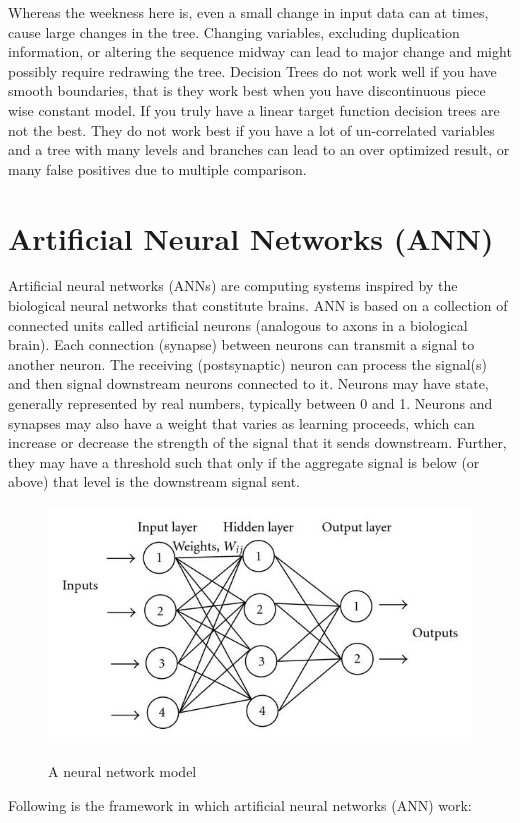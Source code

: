 \noindent Whereas the weekness here is, even a small change in input data can at times, cause large changes in the tree. Changing variables, excluding duplication information, or altering the sequence midway can lead to major change and might possibly require redrawing the tree. Decision Trees do not work well if you have smooth boundaries, that is they work best when you have discontinuous piece wise constant model. If you truly have a linear target function decision trees are not the best. They do not work best if you have a lot of un-correlated variables and a tree with many levels and branches can lead to an over optimized result, or many false positives due to multiple comparison.

\newpage

\section{Artificial Neural Networks (ANN)} \label{Artificial Neural Networks (ANN)}

\noindent Artificial neural networks (ANNs) are computing systems inspired by the biological neural networks that constitute brains. ANN is based on a collection of connected units called artificial neurons (analogous to axons in a biological brain). Each connection (synapse) between neurons can transmit a signal to another neuron. The receiving (postsynaptic) neuron can process the signal(s) and then signal downstream neurons connected to it. Neurons may have state, generally represented by real numbers, typically between 0 and 1. Neurons and synapses may also have a weight that varies as learning proceeds, which can increase or decrease the strength of the signal that it sends downstream. Further, they may have a threshold such that only if the aggregate signal is below (or above) that level is the downstream signal sent.

\begin{figure}[h]
\centering
{\includegraphics[scale=2.7]{ANN.jpg}}
\caption{A neural network model}
\end{figure}
\newpage
\noindent Following is the framework in which artificial neural networks (ANN) work:


